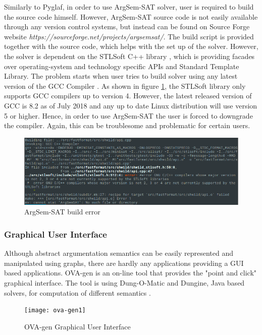 Similarly to Pyglaf, in order to use ArgSem-SAT solver, user is required to build the source code himself. However, ArgSem-SAT source code is not easily available through any version control systems, but instead can be found on Source Forge website \textit{https://sourceforge.net/projects/argsemsat/}. The build script is provided together with the source code, which helps with the set up of the solver. However, the solver is dependent on the STLSoft C++ library \citep{stlsoft}, which is providing facades over operating-system and technology specific APIs and Standard Template Library. The problem starts when user tries to build solver using any latest version of the GCC Compiler \citep{gcc}. As shown in figure \ref{fig:argsemsatBuildError}, the STLSoft library only supports GCC compilers up to version 4. However, the latest released version of GCC is 8.2 as of July 2018 \citep{gcc} and any up to date Linux distribution will use version 5 or higher. Hence, in order to use ArgSem-SAT the user is forced to downgrade the compiler. Again, this can be troublesome and problematic for certain users.

\begin{figure}[h]
	\centering
	\includegraphics[width=\linewidth]{"img/argsemsat_error"}
	\caption{ArgSem-SAT build error}
	\label{fig:argsemsatBuildError}
\end{figure}

\subsubsection{Graphical User Interface}
Although abstract argumentation semantics can be easily represented and manipulated using graphs, there are hardly any applications providing a GUI based applications. OVA-gen is an on-line tool that provides the "point and click" graphical interface. The tool is using Dung-O-Matic and Dungine, Java based solvers, for computation of different semantics \citep{ova-gen}. 

\begin{figure}[h]
	\centering
	\texttt{[image: ova-gen1]}
	\caption{OVA-gen Graphical User Interface}
	\label{fig:ovagen1}
\end{figure}

